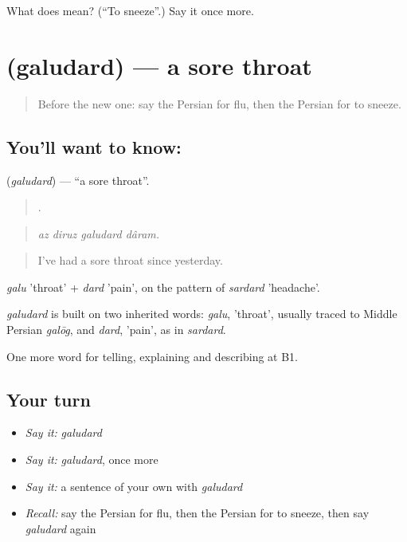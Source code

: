 \begin{tcolorbox}[breakable,colback=teal!4,colframe=teal!35!black,title={Before you move on}]
What does   mean? (\textquotedblleft{}To sneeze\textquotedblright{}.) Say it once more.
\end{tcolorbox}
\section[\texorpdfstring{\fa{گلودرد} (galudard)}{گلودرد (galudard)}]{ (galudard) — a sore throat}

\label{lesson:FA-C490-galudard}



\begin{quote}
Before the new one: say the Persian for flu, then the Persian for to sneeze.
\end{quote}

\subsection*{You'll want to know: }
\textbf{} (\emph{galudard}) — \textquotedblleft{}a sore throat\textquotedblright{}.

\begin{quote}
   .
\end{quote}

\begin{quote}
\emph{az diruz galudard dâram.}
\end{quote}

\begin{quote}
I've had a sore throat since yesterday.
\end{quote}

\emph{galu} 'throat' + \emph{dard} 'pain', on the pattern of \emph{sardard} 'headache'.

\begin{cousinweb}
\emph{galudard} is built on two inherited words: \emph{galu}, 'throat', usually traced to Middle Persian \emph{galōg}, and \emph{dard}, 'pain', as in \emph{sardard}.
\end{cousinweb}

\begin{grammarlens}[title={What you've built}]
One more word for telling, explaining and describing at B1.
\end{grammarlens}

\subsection*{Your turn}
\begin{itemize}
\raggedright
  \item \emph{Say it:} \emph{galudard}
  \item \emph{Say it:} \emph{galudard}, once more
  \item \emph{Say it:} a sentence of your own with \emph{galudard}
  \item \emph{Recall:} say the Persian for flu, then the Persian for to sneeze, then say \emph{galudard} again
\end{itemize}

